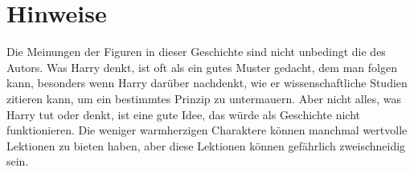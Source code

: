 


\section*{Hinweise}
Die Meinungen der Figuren in dieser Geschichte sind nicht unbedingt die des Autors. Was Harry denkt, ist oft als ein gutes Muster gedacht, dem man folgen kann, besonders wenn Harry darüber nachdenkt, wie er wissenschaftliche Studien zitieren kann, um ein bestimmtes Prinzip zu untermauern. Aber nicht alles, was Harry tut oder denkt, ist eine gute Idee, das würde als Geschichte nicht funktionieren. Die weniger warmherzigen Charaktere können manchmal wertvolle Lektionen zu bieten haben, aber diese Lektionen können gefährlich zweischneidig sein.



